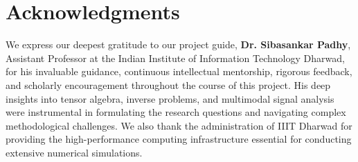 \vspace{0.4cm}
\section*{Acknowledgments}
{\small
We express our deepest gratitude to our project guide, \textbf{Dr. Sibasankar Padhy}, Assistant Professor at the Indian Institute of Information Technology Dharwad, for his invaluable guidance, continuous intellectual mentorship, rigorous feedback, and scholarly encouragement throughout the course of this project. His deep insights into tensor algebra, inverse problems, and multimodal signal analysis were instrumental in formulating the research questions and navigating complex methodological challenges. We also thank the administration of IIIT Dharwad for providing the high-performance computing infrastructure essential for conducting extensive numerical simulations.
}

\newpage
\setcounter{tocdepth}{2}
\begingroup
\small
{}
\setlength{\parskip}{0pt}
\tableofcontents
\endgroup

\newpage
\begingroup
\small
{}
\let\oldclearpage\clearpage
\renewcommand{\clearpage}{}
\listoffigures
\vspace{0.25cm}
\listoftables
\let\clearpage\oldclearpage
\endgroup

\newpage
